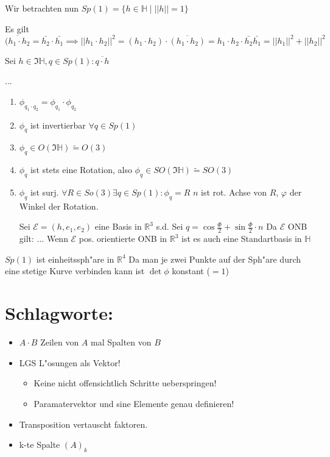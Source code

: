 \documentclass[oneside,fontsize=11pt,paper=a4,BCOR=0mm,DIV=12,automark,headsepline]{scrbook}
\theoremstyle{remark}
\theoremstyle{definition}
\theoremstyle{definition}
\theoremstyle{remark}
\begin{document}
Wir betrachten nun $Sp(1)=\{h\in \mathbb{H} \mid ||h|| = 1\}$

\begin{relation}
  Es gilt $\overline{(h_1\cdot h_2}=\bar{h_2}\cdot \bar{h_1} \implies ||h_1
  \cdot h_2||^2 = (h_1 \cdot h_2) \cdot \overline{(h_1 \cdot h_2)} = h_1\cdot
  h_2 \cdot \bar{h_2} \bar{h_1} = ||h_1||^2 + ||h_2||^2$


  Sei $h\in \Im \mathbb{H}, q\in Sp(1): \overline{q\cdot h }$
\end{relation}

...

\begin{relation}
  \begin{enumerate}
  \item $\phi_{q_1 \cdot q_2} = \phi_{q_1} \cdot \phi_{q_2} $
  \item $\phi_q$ ist invertierbar $\forall q \in Sp(1)$
  \item $\phi_q \in O(\Im \mathbb{H}) \tilde{=} O(3)$
  \item $\phi_q$ ist stets eine Rotation, also $\phi_q \in SO(\Im \mathbb{H})
    \tilde{=} SO(3)$  
  \item $\phi_q$ ist surj. $\forall R\in So(3) \exists q\in Sp(1): \phi_q = R$
    $n$ ist rot. Achse von $R$, $\varphi$ der Winkel der Rotation.

    Sei $\mathcal{E} = (h, e_1, e_2)$ eine Basis in $\mathbb{R}^3$ s.d.
    Sei $q=\cos \frac{\varPhi}{2} + \sin \frac{\varPhi}{2}\cdot n$ Da $\mathcal{E}$
    ONB gilt: ... Wenn $\mathcal{E}$ pos. orientierte ONB in $\mathbb{R}^3$ ist es
    auch eine Standartbasis in $\mathbb{H}$
  \end{enumerate}

$Sp(1)$ ist einheitssph"are in $\mathbb{R}^4$ Da man je zwei Punkte auf der
Sph"are durch eine stetige Kurve verbinden kann ist $\det \phi$ konstant ($=1$)
\end{relation}



\section{Schlagworte:}
\label{sec:orgcf8c685}
\begin{itemize}
\item \(A\cdot B\) Zeilen von \(A\) mal Spalten von \(B\)
\item LGS L"osungen als Vektor!
\begin{itemize}
\item Keine nicht offensichtlich Schritte ueberspringen!
\item Paramatervektor und sine Elemente genau definieren!
\end{itemize}
\item Transposition vertauscht faktoren.
\item k-te Spalte \((A)_k\)
\end{itemize}

\end{document}
